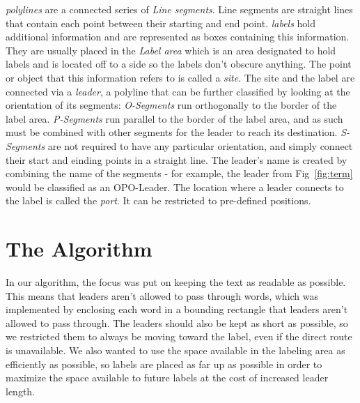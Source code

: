 \documentclass[11pt,a4paper]{vutinfth}
\begin{document}
\emph{polylines} are a connected series of \emph{Line segments}. Line segments are straight lines that contain each point between their starting and end point. %
\emph{labels} hold additional information and are represented as boxes containing this information. They are usually placed in the \emph{Label area} which is an area designated to hold labels and is located off to a side so the labels don't obscure anything.
The point or object that this information refers to is called a \emph{site}. The site and the label are connected via a \emph{leader}, a polyline that can be further classified by looking at the orientation of its segments: \emph{O-Segments} run orthogonally to the border of the label area. \emph{P-Segments} run parallel to the border of the label area, and as such must be combined with other segments for the leader to reach its destination. \emph{S-Segments} are not required to have any particular orientation, and simply connect their start and einding points in a straight line.
The leader's name is created by combining the name of the segments - for example, the leader from Fig~\ref{fig:term} would be classified as an OPO-Leader.
The location where a leader connects to the label is called the \emph{port}. It can be restricted to pre-defined positions. %


\chapter{The Algorithm}

In our algorithm, the focus was put on keeping the text as readable as possible. This means that leaders aren't allowed to pass through words, which was implemented by enclosing each word in a bounding rectangle that leaders aren't allowed to pass through.
The leaders should also be kept as short as possible, so we restricted them to always be moving toward the label, even if the direct route is unavailable.%
We also wanted to use the space available in the labeling area as efficiently as possible, so labels are placed as far up as possible in order to maximize the space available to future labels at the cost of increased leader length.
\end{document}

